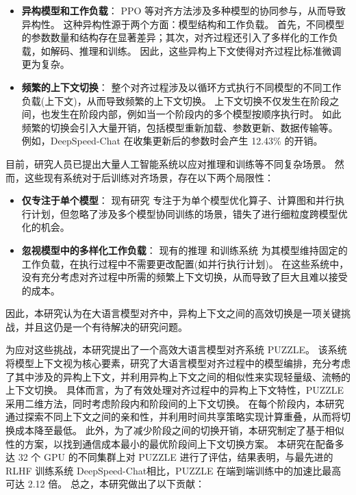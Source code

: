 \begin{itemize}
    \item 
    \textbf{异构模型和工作负载}：
    PPO 等对齐方法涉及多种模型的协同参与，从而导致异构性。
    这种异构性源于两个方面：模型结构和工作负载。
    首先，不同模型的参数数量和结构存在显著差异；其次，对齐过程还引入了多样化的工作负载，如解码、推理和训练。
    因此，这些异构上下文使得对齐过程比标准微调更为复杂。 

    \item 
    \textbf{频繁的上下文切换}：
    整个对齐过程涉及以循环方式执行不同模型的不同工作负载(上下文)，从而导致频繁的上下文切换。
    上下文切换不仅发生在阶段之间，也发生在阶段内部，例如当一个阶段内的多个模型按顺序执行时。
    如此频繁的切换会引入大量开销，包括模型重新加载、参数更新、数据传输等。
    例如，DeepSpeed-Chat 在收集更新后的参数时会产生 12.43\% 的开销。 
\end{itemize}


目前，研究人员已提出大量人工智能系统以应对推理和训练等不同复杂场景。
然而，这些现有系统对于后训练对齐场景，存在以下两个局限性： 

\begin{itemize}
    \item
    \textbf{仅专注于单个模型}：
    现有研究 \cite{liaman2022alpa,narayanan2019pipedream,narayanan2021megatronv2,kwon2023vllm}专注于为单个模型优化算子、计算图和并行执行计划，但忽略了涉及多个模型协同训练的场景，错失了进行细粒度跨模型优化的机会。 
    \item
    \textbf{忽视模型中的多样化工作负载}：
    现有的推理 \cite{zhuohan2023alpaserve,kwon2023vllm,yu2022orca} 和训练系统 \cite{xiao2020antman,xiao2018gandiva} 为其模型维持固定的工作负载，在执行过程中不需要更改配置(如并行执行计划)。
    在这些系统中，没有充分考虑对齐过程中所需的频繁上下文切换，从而导致了巨大且难以接受的成本。 
\end{itemize}

因此，本研究认为在大语言模型对齐中，异构上下文之间的高效切换是一项关键挑战，并且这仍是一个有待解决的研究问题。 

为应对这些挑战，本研究提出了一个高效大语言模型对齐系统 PUZZLE。
该系统将模型上下文视为核心要素，研究了大语言模型对齐过程中的模型编排，充分考虑了其中涉及的异构上下文，并利用异构上下文之间的相似性来实现轻量级、流畅的上下文切换。
具体而言，为了有效处理对齐过程中的异构上下文特性，PUZZLE 采用二维方法，同时考虑阶段内和阶段间的上下文切换。
在每个阶段内，本研究通过探索不同上下文之间的亲和性，并利用时间共享策略实现计算重叠，从而将切换成本降至最低。
此外，为了减少阶段之间的切换开销，本研究制定了基于相似性的方案，以找到通信成本最小的最优阶段间上下文切换方案。
本研究在配备多达 32 个 GPU 的不同集群上对 PUZZLE 进行了评估，结果表明，与最先进的 RLHF 训练系统 DeepSpeed-Chat\cite{yao2023deepspeedchat}相比，PUZZLE 在端到端训练中的加速比最高可达 2.12 倍。 
总之，本研究做出了以下贡献： 

